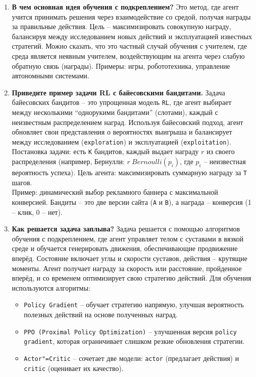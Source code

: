 \documentclass{article}
\begin{document}
\begin{enumerate}
    \item \textbf{В чем основная идея обучения с подкреплением?}
        Это метод, где агент учится принимать решения через взаимодействие со средой, получая награды за правильные действия. Цель -- максимизировать совокупную награду, балансируя между исследованием новых действий и эксплуатацией известных стратегий. Можно сказать, что это частный случай обучения с учителем, где среда является неявным учителем, воздействующим на агента через слабую обратную связь (награды). Примеры: игры, робототехника, управление автономными системами.
    \item \textbf{Приведите пример задачи RL с байесовскими бандитами.}
        Задача байесовских бандитов -- это упрощенная модель \texttt{RL}, где агент выбирает между несколькими ``однорукими бандитами'' (слотами), каждый с неизвестным распределением наград. Используя байесовский подход, агент обновляет свои представления о вероятностях выигрыша и балансирует между исследованием (\texttt{exploration}) и эксплуатацией (\texttt{exploitation}). \\
        Постановка задачи: есть \texttt{K} бандитов, каждый выдает награду $r$ из своего распределения (например, Бернулли: $r ~ Bernoulli(p_i)$, где $p_i$ -- неизвестная вероятность успеха). Цель агента: максимизировать суммарную награду за \texttt{T} шагов.\\
        Пример: динамический выбор рекламного баннера с максимальной конверсией. Бандиты -- это две версии сайта (\texttt{A} и \texttt{B}), а награда -- конверсия (1 -- клик, 0 -- нет).
    \item \textbf{Как решается задача заплыва?}
        Задача решается с помощью алгоритмов обучения с подкреплением, где агент управляет телом с суставами в вязкой среде и обучается генерировать движения, обеспечивающие продвижение вперёд. Состояние включает углы и скорости суставов, действия -- крутящие моменты. Агент получает награду за скорость или расстояние, пройденное вперёд, и со временем оптимизирует свою стратегию действий. Для обучения используются алгоритмы:
        \begin{itemize}
            \item \texttt{Policy Gradient} -- обучает стратегию напрямую, улучшая вероятность полезных действий на основе полученных наград.
            \item \texttt{PPO (Proximal Policy Optimization)} -- улучшенная версия \texttt{policy gradient}, которая ограничивает слишком резкие обновления стратегии.
            \item \texttt{Actor"=Critic} -- сочетает две модели: \texttt{actor} (предлагает действия) и \texttt{critic} (оценивает их качество).
        \end{itemize}
\end{enumerate}
\end{document}
